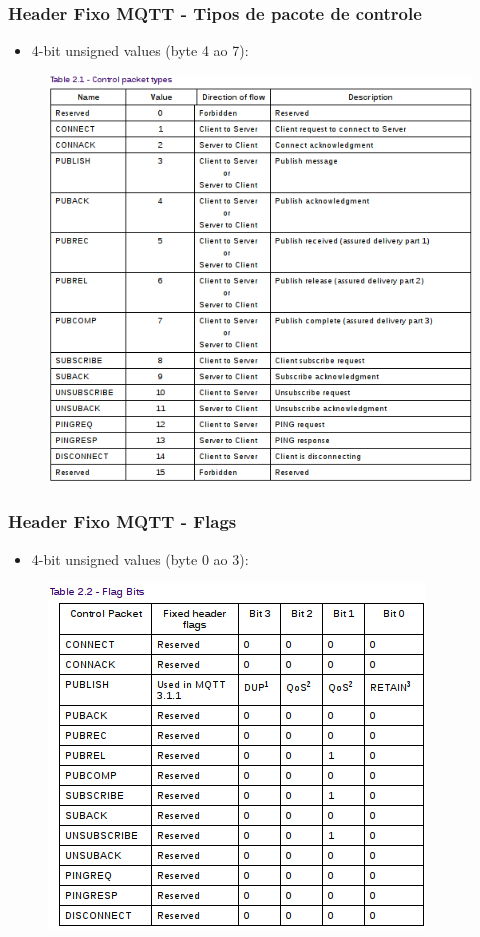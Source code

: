 \documentclass{beamer}
\begin{document}

\begin{frame}
\frametitle{Header Fixo MQTT - Tipos de pacote de controle}
\begin{itemize}
\item 4-bit unsigned values (byte 4 ao 7):
\end{itemize}
\begin{figure}
\centering
\includegraphics[scale=0.4]{MQTT-TypesOfControlPackets}
\end{figure}
\end{frame}


\begin{frame}
\frametitle{Header Fixo MQTT - Flags}
\begin{itemize}
\item 4-bit unsigned values (byte 0 ao 3):
\end{itemize}
\begin{figure}
\centering
\includegraphics[scale=0.5]{MQTT-FixedHeader-Flags}
\end{figure}
\end{frame}
\end{document}
